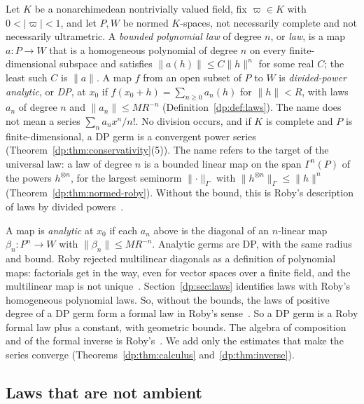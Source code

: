 \documentclass[11pt]{amsart}
\theoremstyle{definition}
\theoremstyle{remark}
\numberwithin{equation}{section}
\newcommand{\abs}[1]{\lvert #1\rvert}
\newcommand{\norm}[1]{\lVert #1\rVert}
\theoremstyle{plain}
\theoremstyle{definition}
\theoremstyle{plain}
\begin{document}
Let $K$ be a nonarchimedean nontrivially valued field, fix $\varpi\in K$ with $0<\abs\varpi<1$, and let $P,W$ be normed $K$-spaces, not necessarily complete and not necessarily ultrametric. A \emph{bounded polynomial law} of degree $n$, or \emph{law}, is a map $a\colon P\to W$ that is a homogeneous polynomial of degree $n$ on every finite-dimensional subspace and satisfies $\norm{a(h)}\le C\norm h^n$ for some real $C$; the least such $C$ is $\norm a$. A map $f$ from an open subset of $P$ to $W$ is \emph{divided-power analytic}, or \emph{DP}, at $x_0$ if $f(x_0+h)=\sum_{n\ge0}a_n(h)$ for $\norm h<R$, with laws $a_n$ of degree $n$ and $\norm{a_n}\le MR^{-n}$ (Definition~\ref{dp:def:laws}). The name does not mean a series $\sum_na_nx^n/n!$. No division occurs, and if $K$ is complete and $P$ is finite-dimensional, a DP germ is a convergent power series (Theorem~\ref{dp:thm:conservativity}(5)). The name refers to the target of the universal law: a law of degree $n$ is a bounded linear map on the span $\Gamma^n(P)$ of the powers $h^{\otimes n}$, for the largest seminorm $\norm\cdot_\Gamma$ with $\norm{h^{\otimes n}}_\Gamma\le\norm h^n$ (Theorem~\ref{dp:thm:normed-roby}). Without the bound, this is Roby's description of laws by divided powers~\cite[Th.~IV.1, Prop.~IV.5]{Ro}.

A map is \emph{analytic} at $x_0$ if each $a_n$ above is the diagonal of an $n$-linear map $\beta_n\colon P^n\to W$ with $\norm{\beta_n}\le MR^{-n}$. Analytic germs are DP, with the same radius and bound. Roby rejected multilinear diagonals as a definition of polynomial maps: factorials get in the way, even for vector spaces over a finite field, and the multilinear map is not unique~\cite[p.~214]{Ro}. Section~\ref{dp:sec:laws} identifies laws with Roby's homogeneous polynomial laws. So, without the bounds, the laws of positive degree of a DP germ form a formal law in Roby's sense~\cite[Th.~VI.1, Th.~VI.2]{Ro}. So a DP germ is a Roby formal law plus a constant, with geometric bounds. The algebra of composition and of the formal inverse is Roby's~\cite[VI~\S8, Prop.~VI.6, Cor.; Th.~VI.3, Prop.~VI.8]{Ro}. We add only the estimates that make the series converge (Theorems~\ref{dp:thm:calculus} and~\ref{dp:thm:inverse}).

\subsection*{Laws that are not ambient}
\end{document}
